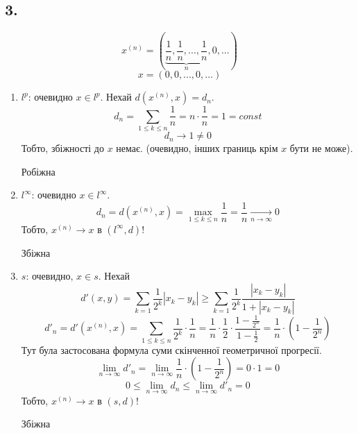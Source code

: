 \documentclass[11pt, a4paper]{article} %
\begin{document}
\subsection*{3.}
\begin{mdframed}
    \[x^{(n)} = (\underset{n}{\underbrace{\frac{1}{n},\frac{1}{n},...,\frac{1}{n}}},0,...)\]
    \[x = (0,0,...,0,...)\]
\end{mdframed}
\begin{enumerate}
    \item $l^p$: очевидно $x\in l^p$.
    Нехай $d(x^{(n)}, x) = d_n$.
    \[d_n = \sum_{1 \le k \le n} \frac{1}{n} = n \cdot \frac{1}{n} = 1 = const\]
    \[d_n \longrightarrow 1 \ne 0\]
    Тобто, збіжності до $x$ немає. (очевидно, інших границь крім $x$ бути не може).

    \begin{mdframed}[backgroundcolor=red!20]
    Робіжна
    \end{mdframed}
    

    \item $l^\infty$: очевидно $x\in l^\infty$.
    \[d_n = d(x^{(n)}, x) = \max_{1 \le k \le n} \frac{1}{n} = \frac{1}{n} \underset{n\to\infty}{\longrightarrow} 0\]
    Тобто, $x^{(n)} \longrightarrow x$ в $(l^\infty, d)$! 
    
    \begin{mdframed}[style=ans]
    Збіжна
    \end{mdframed}

    \item $s$: очевидно, $x \in s$. 
    Нехай \[d'(x,y) = \sum_{k=1} \frac{1}{2^k} |x_k - y_k| \ge \sum_{k=1} \frac{1}{2^k} \frac{|x_k - y_k|}{1+|x_k - y_k|}\]
    \[d'_n = d'(x^{(n)}, x) = \sum_{1\le k \le n} \frac{1}{2^k} \cdot \frac{1}{n} = \frac{1}{n} \cdot \frac{1}{2} \cdot \frac{1-\frac{1}{2^n}}{1-\frac{1}{2}} = \frac{1}{n} \cdot \left(1-\frac{1}{2^n}\right)\]
    Тут була застосована формула суми скінченної геометричної прогресії.
    \[\lim_{n\to\infty} d'_n = \lim_{n\to\infty} \frac{1}{n} \cdot \left(1-\frac{1}{2^n}\right) = 0 \cdot 1 = 0\]
    \[0 \le \lim_{n\to\infty} d_n \le \lim_{n\to\infty} d'_n = 0\]
    Тобто, $x^{(n)} \longrightarrow x$ в $(s, d)$! 
    
    \begin{mdframed}[style=ans]
    Збіжна
    \end{mdframed}
\end{enumerate}
\pagebreak
\end{document}
